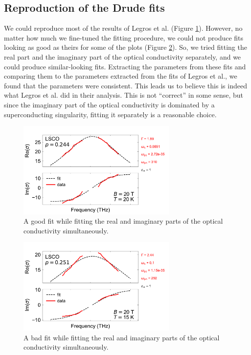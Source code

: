 \subsection{Reproduction of the Drude fits}
We could reproduce most of the results of Legros et al. (Figure \ref{fig:drude_fit_good}).
However, no matter how much we fine-tuned the fitting procedure, we could not produce fits looking
as good as theirs for some of the plots (Figure \ref{fig:drude_fit_bad}). So, we tried fitting the
real part and the imaginary part of the optical conductivity separately, and we could produce
similar-looking fits. Extracting the parameters from these fits and comparing them to the parameters
extracted from the fits of Legros et al., we found that the parameters were consistent. This leads
us to believe this is indeed what Legros et al. did in their analysis. This is not ``correct'' in
some sense, but since the imaginary part of the optical conductivity is dominated by a
superconducting singularity, fitting it separately is a reasonable choice.

\begin{figure}
    \centering
    \includegraphics[width=0.7\textwidth]{figures/drude_fit_good.pdf}
    \caption{A good fit while fitting the real and imaginary parts of the optical conductivity
        simultaneously.}
    \label{fig:drude_fit_good}
\end{figure}
\begin{figure}
    \centering
    \includegraphics[width=0.7\textwidth]{figures/drude_fit_bad.pdf}
    \caption{A bad fit while fitting the real and imaginary parts of the optical conductivity
        simultaneously.}
    \label{fig:drude_fit_bad}
\end{figure}

